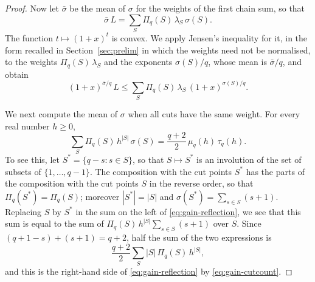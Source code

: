 \documentclass{amsart}
\theoremstyle{definition}
\theoremstyle{remark}
\numberwithin{equation}{section}
\begin{document}
\begin{proof}
Now let $\bar\sigma$ be the mean of $\sigma$ for the weights of the first
chain sum, so that
\[
\bar\sigma\,L=\sum_{S}\Pi_q(S)\,\lambda_S\,\sigma(S).
\]
The function $t\mapsto(1+x)^{t}$ is convex. We apply Jensen's inequality for
it, in the form recalled in Section~\ref{sec:prelim} in which the weights
need not be normalised, to the weights $\Pi_q(S)\,\lambda_S$ and the
exponents $\sigma(S)/q$, whose mean is $\bar\sigma/q$, and obtain
\begin{equation}\label{eq:gain-jensen}
(1+x)^{\bar\sigma/q}\,L\le\sum_{S}\Pi_q(S)\,\lambda_S\,(1+x)^{\sigma(S)/q}.
\end{equation}

We next compute the mean of $\sigma$ when all cuts have the same weight. For
every real number $h\ge0$,
\begin{equation}\label{eq:gain-reflection}
\sum_{S}\Pi_q(S)\,h^{|S|}\,\sigma(S)=\frac{q+2}{2}\,\mu_q(h)\,\tau_q(h).
\end{equation}
To see this, let $S^{*}=\{q-s:s\in S\}$, so that $S\mapsto S^{*}$ is an
involution of the set of subsets of $\{1,\dots,q-1\}$. The
composition with the cut points $S^{*}$ has the parts of the composition
with the cut points $S$ in the reverse order, so that
$\Pi_q(S^{*})=\Pi_q(S)$; moreover $|S^{*}|=|S|$ and
$\sigma(S^{*})=\sum_{s\in S}(s+1)$. Replacing $S$ by $S^{*}$ in the sum on
the left of \eqref{eq:gain-reflection}, we see that this sum is equal to the
sum of $\Pi_q(S)\,h^{|S|}\sum_{s\in S}(s+1)$ over $S$. Since
$(q+1-s)+(s+1)=q+2$, half the sum of the two expressions is
\[
\frac{q+2}{2}\sum_{S}|S|\,\Pi_q(S)\,h^{|S|},
\]
and this is the right-hand side of \eqref{eq:gain-reflection} by
\eqref{eq:gain-cutcount}.


\end{proof}
\end{document}
